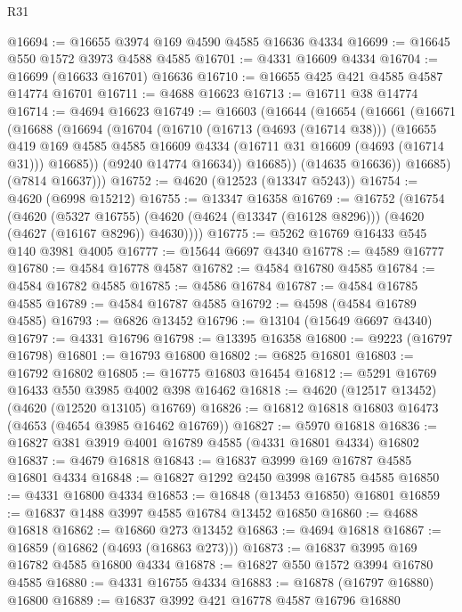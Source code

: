 \begin{lexlean}{R31}
\begin{coremodule}
@16694 := @16655 @3974 @169 @4590 @4585 @16636 @4334
@16699 := @16645 @550 @1572 @3973 @4588 @4585
@16701 := @4331 @16609 @4334
@16704 := @16699 (@16633 @16701) @16636
@16710 := @16655 @425 @421 @4585 @4587 @14774 @16701
@16711 := @4688 @16623
@16713 := @16711 @38 @14774
@16714 := @4694 @16623
@16749 := @16603
    (@16644
      (@16654
        (@16661
          (@16671
            (@16688
              (@16694
                (@16704
                  (@16710
                    (@16713 (@4693 (@16714 @38)))
                    (@16655
                      @419
                      @169
                      @4585
                      @4585
                      @16609
                      @4334
                      (@16711 @31 @16609 (@4693 (@16714 @31)))
                      @16685))
                  (@9240 @14774 @16634))
                @16685))
            (@14635 @16636))
          @16685)
        (@7814 @16637)))
@16752 := @4620 (@12523 (@13347 @5243))
@16754 := @4620 (@6998 @15212)
@16755 := @13347 @16358
@16769 := @16752
    (@16754
      (@4620
        (@5327 @16755)
        (@4620 (@4624 (@13347 (@16128 @8296))) (@4620 (@4627 (@16167 @8296)) @4630))))
@16775 := @5262 @16769 @16433 @545 @140 @3981 @4005
@16777 := @15644 @6697 @4340
@16778 := @4589 @16777
@16780 := @4584 @16778 @4587
@16782 := @4584 @16780 @4585
@16784 := @4584 @16782 @4585
@16785 := @4586 @16784
@16787 := @4584 @16785 @4585
@16789 := @4584 @16787 @4585
@16792 := @4598 (@4584 @16789 @4585)
@16793 := @6826 @13452
@16796 := @13104 (@15649 @6697 @4340)
@16797 := @4331 @16796
@16798 := @13395 @16358
@16800 := @9223 (@16797 @16798)
@16801 := @16793 @16800
@16802 := @6825 @16801
@16803 := @16792 @16802
@16805 := @16775 @16803 @16454
@16812 := @5291 @16769 @16433 @550 @3985 @4002 @398 @16462
@16818 := @4620 (@12517 @13452) (@4620 (@12520 @13105) @16769)
@16826 := @16812 @16818 @16803 @16473 (@4653 (@4654 @3985 @16462 @16769))
@16827 := @5970 @16818
@16836 := @16827 @381 @3919 @4001 @16789 @4585 (@4331 @16801 @4334) @16802
@16837 := @4679 @16818
@16843 := @16837 @3999 @169 @16787 @4585 @16801 @4334
@16848 := @16827 @1292 @2450 @3998 @16785 @4585
@16850 := @4331 @16800 @4334
@16853 := @16848 (@13453 @16850) @16801
@16859 := @16837 @1488 @3997 @4585 @16784 @13452 @16850
@16860 := @4688 @16818
@16862 := @16860 @273 @13452
@16863 := @4694 @16818
@16867 := @16859 (@16862 (@4693 (@16863 @273)))
@16873 := @16837 @3995 @169 @16782 @4585 @16800 @4334
@16878 := @16827 @550 @1572 @3994 @16780 @4585
@16880 := @4331 @16755 @4334
@16883 := @16878 (@16797 @16880) @16800
@16889 := @16837 @3992 @421 @16778 @4587 @16796 @16880

\end{coremodule}
\end{lexlean}
